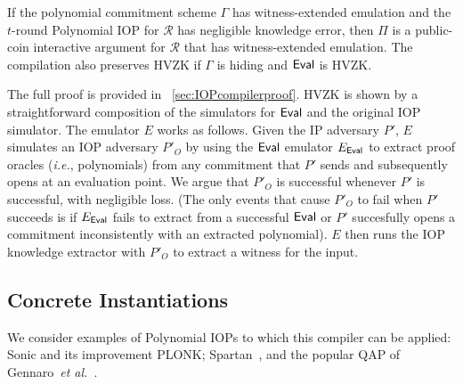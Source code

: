 \begin{theorem}\label{thm:IOPcompiler}
If the polynomial commitment scheme $\Gamma$ has witness-extended emulation and the $t$-round Polynomial IOP for $\mathcal{R}$ has negligible knowledge error, then $\Pi$ is a public-coin interactive argument for $\mathcal{R}$ that has witness-extended emulation. The compilation also preserves HVZK if $\Gamma$ is hiding and $\textsf{{Eval}}$ is HVZK. 
\end{theorem}

The full proof is provided in \appendixphrase~\ref{sec:IOPcompilerproof}. 
HVZK is shown by a straightforward composition of the simulators for $\textsf{{Eval}}$ and the original IOP simulator. The emulator $E$ works as follows. Given the IP adversary $P'$, $E$ simulates an IOP adversary $P'_O$ by using the $\textsf{{Eval}}$ emulator $E_\textsf{{Eval}}$ to extract proof oracles (\emph{i.e.}, polynomials) from any commitment that $P'$ sends and subsequently opens at an evaluation point. We argue that $P'_O$ is successful whenever $P'$ is successful, with negligible loss. (The only events that cause $P'_O$ to fail when $P'$ succeeds is if $E_\textsf{{Eval}}$ fails to extract from a successful $\textsf{{Eval}}$ or $P'$ succesfully opens a commitment inconsistently with an extracted polynomial). $E$ then runs the IOP knowledge extractor with $P'_O$ to extract a witness for the input. 


\subsection{Concrete Instantiations} 
We consider examples of Polynomial IOPs to which this compiler can be applied: \textsf{Sonic} and its improvement \textsf{PLONK}; \textsf{Spartan}~\cite{Spartan}, and the popular QAP of Gennaro~\emph{et al.}~\cite{EC:GGPR13}. 
\ifappendix
\fi

